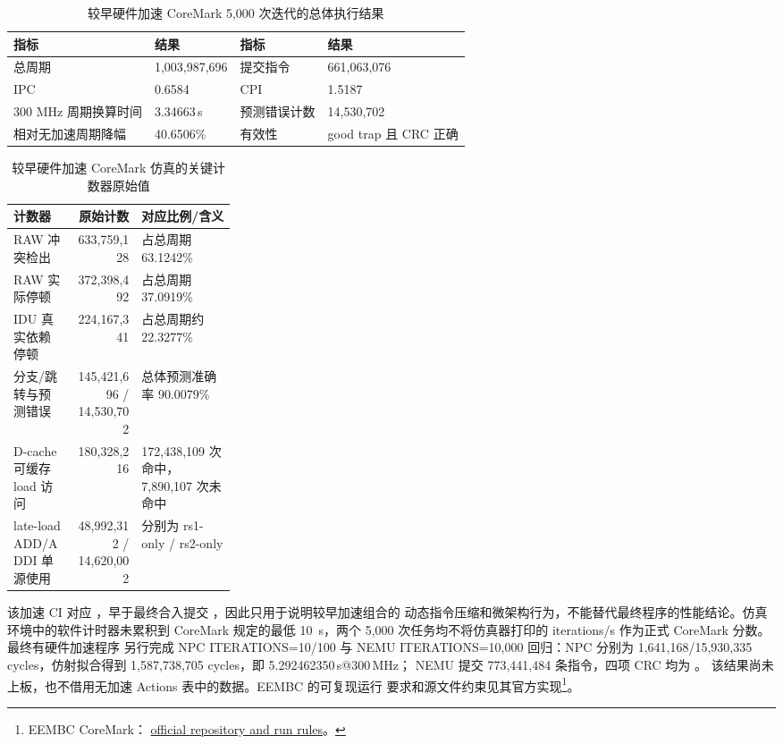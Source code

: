 \begin{table}[H]\centering
\caption*{较早硬件加速 CoreMark 5,000 次迭代的总体执行结果}
\small
\begin{tabularx}{\linewidth}{@{}lYlY@{}}\toprule
\textbf{指标}&\textbf{结果}&\textbf{指标}&\textbf{结果}\\\midrule
总周期&1,003,987,696&提交指令&661,063,076\\
IPC&0.6584&CPI&1.5187\\
300 MHz 周期换算时间&3.34663\,s&预测错误计数&14,530,702\\
相对无加速周期降幅&40.6506\%&有效性&good trap 且 CRC 正确\\
\bottomrule\end{tabularx}
\end{table}



\begin{table}[H]\centering
\caption*{较早硬件加速 CoreMark 仿真的关键计数器原始值}
\scriptsize
\begin{tabularx}{\linewidth}{@{}p{0.29\linewidth}rY@{}}\toprule
\textbf{计数器}&\textbf{原始计数}&\textbf{对应比例/含义}\\\midrule
RAW 冲突检出&633,759,128&占总周期 63.1242\%\\
RAW 实际停顿&372,398,492&占总周期 37.0919\%\\
IDU 真实依赖停顿&224,167,341&占总周期约 22.3277\%\\
分支/跳转与预测错误&145,421,696 / 14,530,702&总体预测准确率 90.0079\%\\
D-cache 可缓存 load 访问&180,328,216&172,438,109 次命中，7,890,107 次未命中\\
late-load ADD/ADDI 单源使用&48,992,312 / 14,620,002&分别为 rs1-only / rs2-only\\
\bottomrule\end{tabularx}
\end{table}

该加速 CI 对应 ，早于最终合入提交 ，因此只用于说明较早加速组合的
动态指令压缩和微架构行为，不能替代最终程序的性能结论。仿真环境中的软件计时器未累积到 CoreMark
规定的最低 10~s，两个 5,000 次任务均不将仿真器打印的 iterations/s 作为正式 CoreMark 分数。最终有硬件加速程序
另行完成 NPC ITERATIONS=10/100 与 NEMU ITERATIONS=10,000 回归：NPC 分别为
1,641,168/15,930,335 cycles，仿射拟合得到 1,587,738,705 cycles，即 5.292462350\,s@300\,MHz；
NEMU 提交 773,441,484 条指令，四项 CRC 均为 。
该结果尚未上板，也不借用无加速 Actions 表中的数据。EEMBC 的可复现运行
要求和源文件约束见其官方实现\footnote{EEMBC CoreMark：
\href{https://github.com/eembc/coremark}{official repository and run rules}。}。


